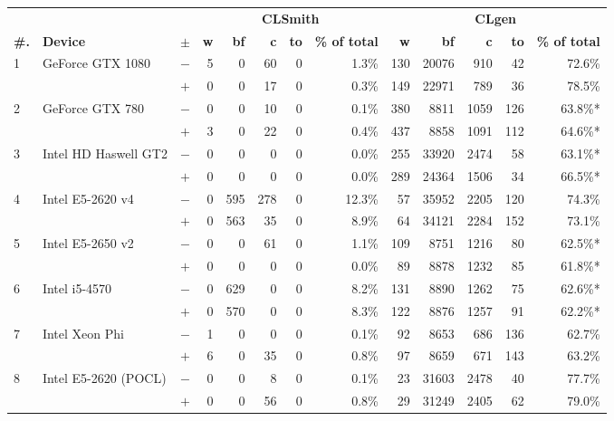   \begin{tabular}{lll | rrrrr | rrrrr }
  \toprule
  & & & \multicolumn{5}{c|}{\textbf{CLSmith}} & \multicolumn{5}{c}{\textbf{CLgen}} \\
  \textbf{\#.} & \textbf{Device} & $\pm$ &
  \textbf{w} & \textbf{bf} & \textbf{c} & \textbf{to} & \textbf{\% of total} &
  \textbf{w} & \textbf{bf} & \textbf{c} & \textbf{to} & \textbf{\% of total} \\
  \midrule
  \multirow{ 2}{*}{1} & \multirow{ 2}{*}{GeForce GTX 1080} & $-$ & 5 & 0 & 60 & 0 & 1.3\%       & 130 & 20076 & 910 & 42 & 72.6\% \\& & $+$ & 0 & 0 & 17 & 0 & 0.3\% & 149 & 22971 & 789 & 36 & 78.5\% \\
\hline
\multirow{ 2}{*}{2} & \multirow{ 2}{*}{GeForce GTX 780} & $-$ & 0 & 0 & 10 & 0 & 0.1\%       & 380 & 8811 & 1059 & 126 & 63.8\%* \\& & $+$ & 3 & 0 & 22 & 0 & 0.4\% & 437 & 8858 & 1091 & 112 & 64.6\%* \\
\hline
\multirow{ 2}{*}{3} & \multirow{ 2}{*}{Intel HD Haswell GT2} & $-$ & 0 & 0 & 0 & 0 & 0.0\%       & 255 & 33920 & 2474 & 58 & 63.1\%* \\& & $+$ & 0 & 0 & 0 & 0 & 0.0\% & 289 & 24364 & 1506 & 34 & 66.5\%* \\
\hline
\multirow{ 2}{*}{4} & \multirow{ 2}{*}{Intel E5-2620 v4} & $-$ & 0 & 595 & 278 & 0 & 12.3\%       & 57 & 35952 & 2205 & 120 & 74.3\% \\& & $+$ & 0 & 563 & 35 & 0 & 8.9\% & 64 & 34121 & 2284 & 152 & 73.1\% \\
\hline
\multirow{ 2}{*}{5} & \multirow{ 2}{*}{Intel E5-2650 v2} & $-$ & 0 & 0 & 61 & 0 & 1.1\%       & 109 & 8751 & 1216 & 80 & 62.5\%* \\& & $+$ & 0 & 0 & 0 & 0 & 0.0\% & 89 & 8878 & 1232 & 85 & 61.8\%* \\
\hline
\multirow{ 2}{*}{6} & \multirow{ 2}{*}{Intel i5-4570} & $-$ & 0 & 629 & 0 & 0 & 8.2\%       & 131 & 8890 & 1262 & 75 & 62.6\%* \\& & $+$ & 0 & 570 & 0 & 0 & 8.3\% & 122 & 8876 & 1257 & 91 & 62.2\%* \\
\hline
\multirow{ 2}{*}{7} & \multirow{ 2}{*}{Intel Xeon Phi} & $-$ & 1 & 0 & 0 & 0 & 0.1\%       & 92 & 8653 & 686 & 136 & 62.7\% \\& & $+$ & 6 & 0 & 35 & 0 & 0.8\% & 97 & 8659 & 671 & 143 & 63.2\% \\
\hline
\multirow{ 2}{*}{8} & \multirow{ 2}{*}{Intel E5-2620 (POCL)} & $-$ & 0 & 0 & 8 & 0 & 0.1\%       & 23 & 31603 & 2478 & 40 & 77.7\% \\& & $+$ & 0 & 0 & 56 & 0 & 0.8\% & 29 & 31249 & 2405 & 62 & 79.0\% \\

\end{tabular}
